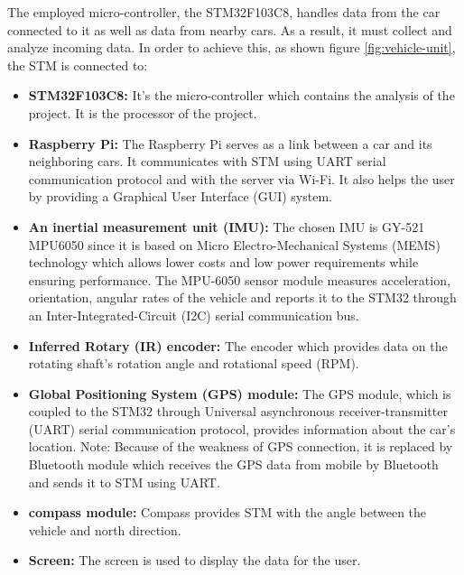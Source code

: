 The employed micro-controller, the STM32F103C8, handles data from the car connected to it as well as data from nearby cars. As a result, it must collect and analyze incoming data. In order to achieve this, as shown figure \ref{fig:vehicle-unit}, the STM is connected to:
\begin{itemize}
    \item \textbf{STM32F103C8: } It's the micro-controller which contains the analysis of the project. It is the processor of the project.
    \item \textbf{Raspberry Pi: }The Raspberry Pi serves as a link between a car and its neighboring cars. It communicates with STM using UART serial communication protocol and with the server via Wi-Fi. It also helps the user by providing a Graphical User Interface (GUI) system.
    \item \textbf{An inertial measurement unit (IMU): } The chosen IMU is GY-521 MPU6050 since it is based on Micro Electro-Mechanical Systems (MEMS) technology  which allows lower costs and low power requirements while ensuring performance. \newline
    The MPU-6050 sensor module measures acceleration, orientation, angular rates of the vehicle and reports it to the STM32 through an Inter-Integrated-Circuit (I2C) serial communication bus.
    \item \textbf{Inferred Rotary (IR) encoder: } The encoder which provides data on the rotating shaft's rotation angle and rotational speed (RPM).
    \item \textbf{Global Positioning System (GPS) module: }The GPS module, which is coupled to the STM32 through Universal asynchronous receiver-transmitter (UART) serial communication protocol, provides information about the car's location. \newline
    Note: Because of the weakness of GPS connection, it is replaced by Bluetooth module which receives the GPS data from mobile by Bluetooth and sends it to STM using UART.
    \item \textbf{compass module: } Compass provides STM with the angle between the vehicle and north direction.
    \item \textbf{Screen: } The screen is used to display the data for the user.
\end{itemize}

